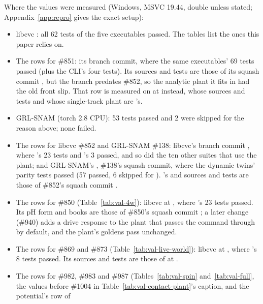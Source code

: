\documentclass[11pt]{article}
\theoremstyle{remark}
\begin{document}
Where the values were measured (Windows, MSVC 19.44, double unless stated; Appendix~\ref{app:repro}
gives the exact setup):
\begin{itemize}
  \item libcvc : all 62 tests of the five executables passed. The tables list the ones
        this paper relies on.
  \item The rows for \#851: its branch commit, where the same executables' 69 tests passed (plus
        the CLI's four  tests). Its  sources and tests are those of its
        squash commit , but the branch predates \#852, so the analytic plant it fits
        in  had the old front slip. That row is
        measured on  at  instead, whose  sources and tests and
        whose single-track plant are 's.
  \item GRL-SNAM  (torch 2.8 CPU): 53 tests passed and 2 were skipped for the
         reason above; none failed.
  \item The rows for libcvc \#852 and GRL-SNAM \#138: libcvc's branch commit , where
        's 23 tests and 's 3 passed,
        and so did the ten other suites that use the plant; and GRL-SNAM's , \#138's squash
        commit, where the dynamic twins' parity tests passed (57 passed, 6 skipped for ).
        's  and  sources and tests are those of \#852's squash
        commit .
  \item The rows for \#850 (Table~\ref{tab:val-4w}): libcvc  at , where
        's 23 tests passed. Its pH form and books are those of \#850's
        squash commit ; a later change (\#940) adds a drive response to the plant
        that passes the command through by default, and the plant's goldens pass unchanged.
  \item The rows for \#869 and \#873 (Table~\ref{tab:val-live-world}): libcvc  at
        , where 's 8 tests passed. Its
         sources and tests are those of  at .
  \item The rows for \#982, \#983 and \#987 (Tables~\ref{tab:val-spin} and~\ref{tab:val-full}, the
        values before \#1004 in Table~\ref{tab:val-contact-plant}'s caption, and the potential's row of

\end{itemize}
\end{document}
